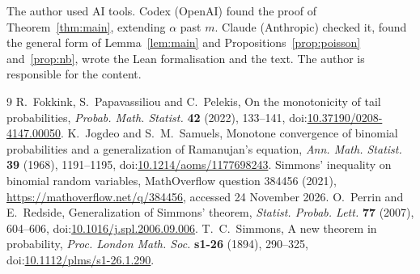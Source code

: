 \documentclass[11pt]{amsart}
\newcommand{\doi}[1]{doi:\href{https://doi.org/#1}{#1}}
\theoremstyle{definition}
\theoremstyle{remark}
\begin{document}
The author used AI tools. Codex (OpenAI) found the proof of Theorem~\ref{thm:main}, extending $\alpha$ past $m$.
Claude (Anthropic) checked it, found the general form of Lemma~\ref{lem:main} and Propositions~\ref{prop:poisson}
and~\ref{prop:nb}, wrote the Lean formalisation and the text. The author is responsible for the content.

\begin{thebibliography}{9}
 R.~Fokkink, S.~Papavassiliou and C.~Pelekis, On the monotonicity of tail probabilities,
\emph{Probab. Math. Statist.} \textbf{42} (2022), 133--141, \doi{10.37190/0208-4147.00050}.
 K.~Jogdeo and S.~M.~Samuels, Monotone convergence of binomial probabilities and a generalization of
Ramanujan's equation, \emph{Ann. Math. Statist.} \textbf{39} (1968), 1191--1195, \doi{10.1214/aoms/1177698243}.
 Simmons' inequality on binomial random variables, MathOverflow question 384456 (2021),
\url{https://mathoverflow.net/q/384456}, accessed 24 November 2026.
 O.~Perrin and E.~Redside, Generalization of Simmons' theorem, \emph{Statist. Probab. Lett.} \textbf{77}
(2007), 604--606, \doi{10.1016/j.spl.2006.09.006}.
 T.~C.~Simmons, A new theorem in probability, \emph{Proc. London Math. Soc.} \textbf{s1-26} (1894),
290--325, \doi{10.1112/plms/s1-26.1.290}.
\end{thebibliography}
\end{document}

